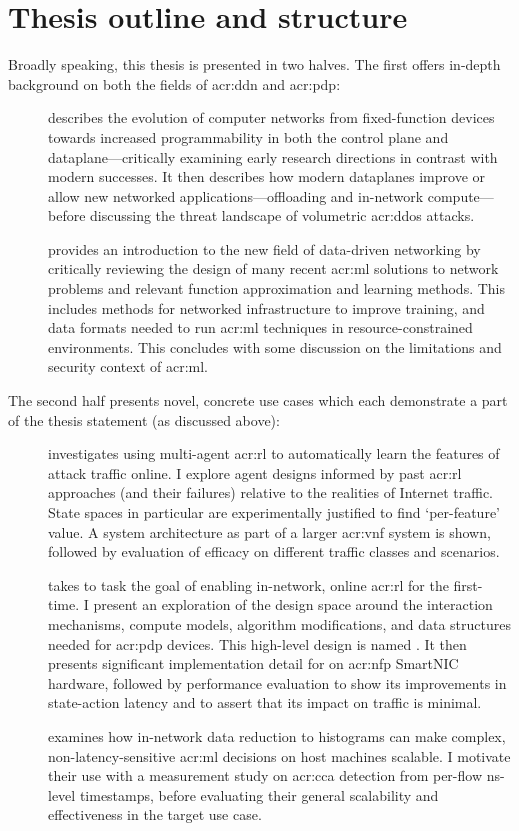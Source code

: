 \section{Thesis outline and structure}
Broadly speaking, this thesis is presented in two halves.
The first offers in-depth background on both the fields of \gls{acr:ddn} and \gls{acr:pdp}:
\begin{description}
	\item[] describes the evolution of computer networks from fixed-function devices towards increased programmability in both the control plane and dataplane---critically examining early research directions in contrast with modern successes. It then describes how modern dataplanes improve or allow new networked applications---offloading and in-network compute---before discussing the threat landscape of volumetric \gls{acr:ddos} attacks.
	\item[] provides an introduction to the new field of data-driven networking by critically reviewing the design of many recent \gls{acr:ml} solutions to network problems and relevant function approximation and learning methods. This includes methods for networked infrastructure to improve training, and data formats needed to run \gls{acr:ml} techniques in resource-constrained environments. This concludes with some discussion on the limitations and security context of \gls{acr:ml}.
\end{description}
The second half presents novel, concrete use cases which each demonstrate a part of the thesis statement (as discussed above):
\begin{description}
	\item[] investigates using multi-agent \gls{acr:rl} to automatically learn the features of attack traffic online. I explore agent designs informed by past \gls{acr:rl} approaches (and their failures) relative to the realities of Internet traffic. State spaces in particular are experimentally justified to find `per-feature' value. A system architecture as part of a larger \gls{acr:vnf} system is shown, followed by evaluation of efficacy on different traffic classes and scenarios.
	\item[] takes to task the goal of enabling in-network, online \gls{acr:rl} for the first-time. I present an exploration of the design space around the interaction mechanisms, compute models, algorithm modifications, and data structures needed for \gls{acr:pdp} devices. This high-level design is named \approachshort{}. It then presents significant implementation detail for \approachshort{} on \gls{acr:nfp} SmartNIC hardware, followed by performance evaluation to show its improvements in state-action latency and to assert that its impact on traffic is minimal.
	\item[] examines how in-network data reduction to histograms can make complex, non-latency-sensitive \gls{acr:ml} decisions on host machines scalable. I motivate their use with a measurement study on \gls{acr:cca} detection from per-flow \unit{\nano\second}-level timestamps, before evaluating their general scalability and effectiveness in the target use case.
\end{description}
